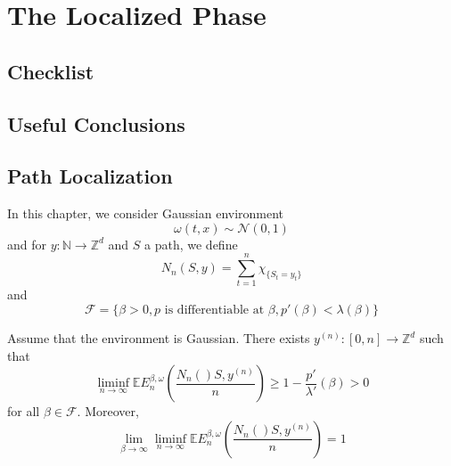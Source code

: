 \section{The Localized Phase}

\subsection{Checklist}

\subsection{Useful Conclusions}

\subsection{Path Localization}

\begin{definition}
    In this chapter, we consider Gaussian environment
    \[
    \omega(t,x) \sim \mathcal{N}(0,1)
    \]
    and for $y:\mathbb{N}\to\mathbb{Z}^d$ and $S$ a path, we define
    \[
    N_n(S,y) = \sum\limits_{t=1}^n \chi_{\{S_t = y_t\}}
    \]
    and
    \[\mathcal{F} = \{\beta > 0, p\text{ is differentiable at }\beta,p'(\beta) < \lambda(\beta)\}\]
\end{definition}

\begin{theorem}
    Assume that the environment is Gaussian. There exists $y^{(n)}:[0,n] \to\mathbb{Z}^d$ such that
    \[
    \liminf_{n\to\infty} \mathbb{E}E_n^{\beta,\omega}\left(\dfrac{N_n()S,y^{(n)}}{n}\right) \geq 1 - \dfrac{p'}{\lambda'}(\beta) > 0
    \]
    for all $\beta \in \mathcal{F}$. Moreover,
    \[
    \lim_{\beta\to\infty} \liminf_{n\to\infty} \mathbb{E}E_n^{\beta,\omega}\left(\dfrac{N_n()S,y^{(n)}}{n}\right) = 1
    \]
\end{theorem}